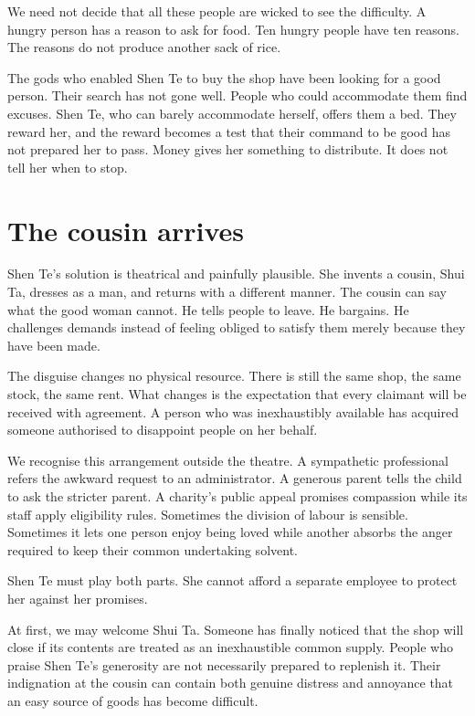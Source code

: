 \documentclass[12pt,a4paper]{book}
\begin{document}
We need not decide that all these people are wicked to see the difficulty. A hungry person has a reason to ask for food. Ten hungry people have ten reasons. The reasons do not produce another sack of rice.

The gods who enabled Shen Te to buy the shop have been looking for a good person. Their search has not gone well. People who could accommodate them find excuses. Shen Te, who can barely accommodate herself, offers them a bed. They reward her, and the reward becomes a test that their command to be good has not prepared her to pass. Money gives her something to distribute. It does not tell her when to stop.

\section*{The cousin arrives}

Shen Te's solution is theatrical and painfully plausible. She invents a cousin, Shui Ta, dresses as a man, and returns with a different manner. The cousin can say what the good woman cannot. He tells people to leave. He bargains. He challenges demands instead of feeling obliged to satisfy them merely because they have been made.

The disguise changes no physical resource. There is still the same shop, the same stock, the same rent. What changes is the expectation that every claimant will be received with agreement. A person who was inexhaustibly available has acquired someone authorised to disappoint people on her behalf.

We recognise this arrangement outside the theatre. A sympathetic professional refers the awkward request to an administrator. A generous parent tells the child to ask the stricter parent. A charity's public appeal promises compassion while its staff apply eligibility rules. Sometimes the division of labour is sensible. Sometimes it lets one person enjoy being loved while another absorbs the anger required to keep their common undertaking solvent.

Shen Te must play both parts. She cannot afford a separate employee to protect her against her promises.

At first, we may welcome Shui Ta. Someone has finally noticed that the shop will close if its contents are treated as an inexhaustible common supply. People who praise Shen Te's generosity are not necessarily prepared to replenish it. Their indignation at the cousin can contain both genuine distress and annoyance that an easy source of goods has become difficult.
\end{document}

